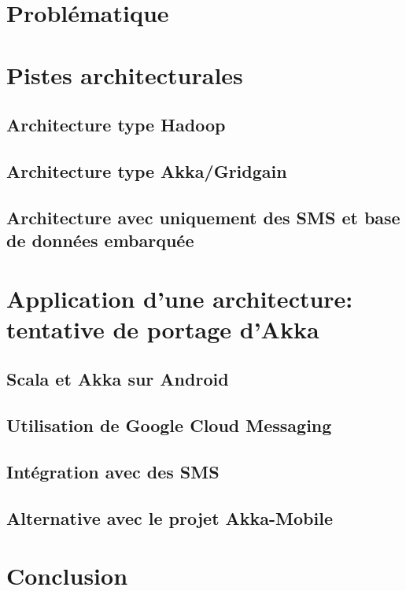 \documentclass[a4paper,12pt]{article}
\begin{document}
\fancyhead[L]{\leftmark}

\section{Problématique}
\section{Pistes architecturales}
\subsection{Architecture type Hadoop}
\subsection{Architecture type Akka/Gridgain}
\subsection{Architecture avec uniquement des SMS et base de données embarquée}
\section{Application d'une architecture: tentative de portage d'Akka}
\subsection{Scala et Akka sur Android}
\subsection{Utilisation de Google Cloud Messaging}
\subsection{Intégration avec des SMS}
\subsection{Alternative avec le projet Akka-Mobile}
\newpage


\section*{Conclusion}
\end{document}
